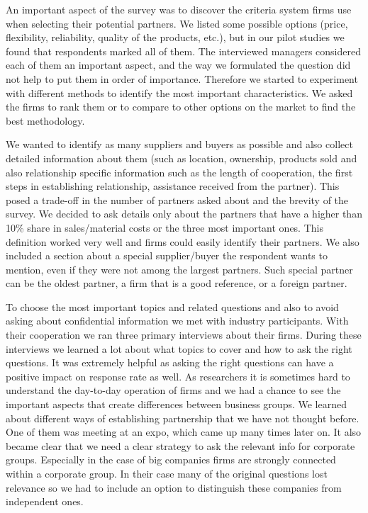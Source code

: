 \documentclass[final, dvipsnames, authoryear,12pt]{elsarticle}
\begin{document}
An important aspect of the survey was to discover the criteria system firms use when selecting their potential partners. We listed some possible options (price, flexibility, reliability, quality of the products, etc.), but in our pilot studies we found that respondents marked all of them. The interviewed managers considered each of them an important aspect, and the way we formulated the question did not help to put them in order of importance. Therefore we started to experiment with different methods to identify the most important characteristics. We asked the firms to rank them or to compare to other options on the market to find the best methodology.

We wanted to identify as many suppliers and buyers as possible and also collect detailed information about them (such as location, ownership, products sold and also relationship specific information such as the length of cooperation, the first steps in establishing relationship, assistance received from the partner). This posed a trade-off in the number of partners asked about and the brevity of the survey. We decided to ask details only about the partners that have a higher than 10\% share in sales/material costs or the three most important ones. This definition worked very well and firms could easily identify their partners. We also included a section about a special supplier/buyer the respondent wants to mention, even if they were not among the largest partners. Such special partner can be the oldest partner, a firm that is a good reference, or a foreign partner.

To choose the most important topics and related questions and also to avoid asking about confidential information we met with industry participants. With their cooperation we ran three primary interviews about their firms. During these interviews we learned a lot about what topics to cover and how to ask the right questions. It was extremely helpful as asking the right questions can have a positive impact on response rate as well. As researchers it is sometimes hard to understand the day-to-day operation of firms and we had a chance to see the important aspects that create differences between business groups. We learned about different ways of establishing partnership that we have not thought before. One of them was meeting at an expo, which came up many times later on. It also became clear that we need a clear strategy to ask the relevant info for corporate groups. Especially in the case of big companies firms are strongly connected within a corporate group. In their case many of the original questions lost relevance so we had to include an option to distinguish these companies from independent ones.
\end{document}

